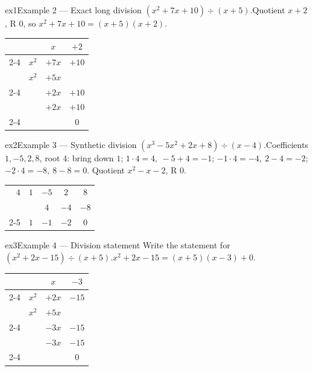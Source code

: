 \documentclass[11pt]{article}
\begin{document}
\begin{example}{ex1}{Example 2 --- Exact long division}
$(x^2+7x+10)\div(x+5)$.\soln Quotient $x+2$, R $0$, so $x^2+7x+10=(x+5)(x+2)$.\begin{center}\renewcommand{\arraystretch}{1.2}\begin{tabular}{cccc}
&  & $x$ & $+2$ \\
\cline{2-4}
\multicolumn{1}{r|}{$x+5$} & $x^2$ & $+7x$ & $+10$ \\
\multicolumn{1}{r|}{} & $x^2$ & $+5x$ &  \\
\cline{2-4}
\multicolumn{1}{r|}{} &  & $+2x$ & $+10$ \\
\multicolumn{1}{r|}{} &  & $+2x$ & $+10$ \\
\cline{2-4}
\multicolumn{1}{r|}{} &  &  & $0$ \\
\end{tabular}\end{center}
\end{example}

\begin{example}{ex2}{Example 3 --- Synthetic division}
$(x^3-5x^2+2x+8)\div(x-4)$.\soln Coefficients $1,-5,2,8$, root $4$: bring down $1$; $1{\cdot}4=4,\ -5{+}4=-1$; $-1{\cdot}4=-4,\ 2{-}4=-2$; $-2{\cdot}4=-8,\ 8{-}8=0$. Quotient $x^2-x-2$, R $0$.\begin{center}\renewcommand{\arraystretch}{1.2}\begin{tabular}{ccccc}
\multicolumn{1}{r|}{$4$} & $1$ & $-5$ & $2$ & $8$ \\
\multicolumn{1}{r|}{} &  & $4$ & $-4$ & $-8$ \\
\cline{2-5}
\multicolumn{1}{r|}{} & $1$ & $-1$ & $-2$ & $0$ \\
\end{tabular}\end{center}
\end{example}

\begin{example}{ex3}{Example 4 --- Division statement}
Write the statement for $(x^2+2x-15)\div(x+5)$.\soln $x^2+2x-15=(x+5)(x-3)+0$.\begin{center}\renewcommand{\arraystretch}{1.2}\begin{tabular}{cccc}
&  & $x$ & $-3$ \\
\cline{2-4}
\multicolumn{1}{r|}{$x+5$} & $x^2$ & $+2x$ & $-15$ \\
\multicolumn{1}{r|}{} & $x^2$ & $+5x$ &  \\
\cline{2-4}
\multicolumn{1}{r|}{} &  & $-3x$ & $-15$ \\
\multicolumn{1}{r|}{} &  & $-3x$ & $-15$ \\
\cline{2-4}
\multicolumn{1}{r|}{} &  &  & $0$ \\
\end{tabular}\end{center}
\end{example}
\end{document}

